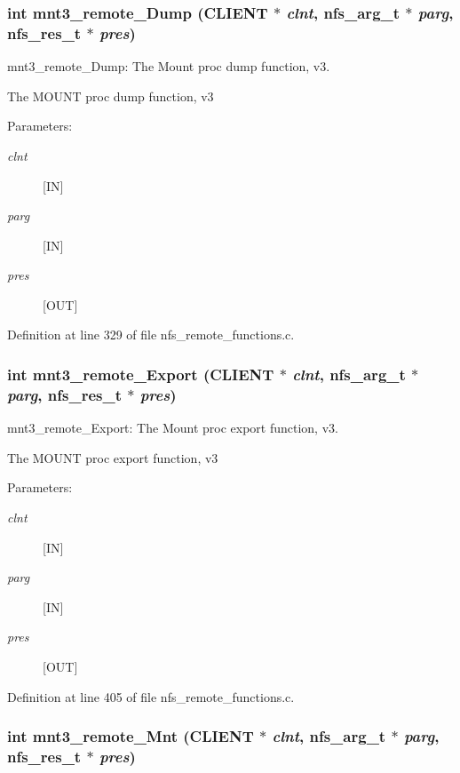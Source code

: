 \subsubsection{\setlength{\rightskip}{0pt plus 5cm}int mnt3\_\-remote\_\-Dump (CLIENT $\ast$ {\em clnt}, nfs\_\-arg\_\-t $\ast$ {\em parg}, nfs\_\-res\_\-t $\ast$ {\em pres})}\label{group__MNTprocs_ga8}


mnt3\_\-remote\_\-Dump: The Mount proc dump function, v3.

The MOUNT proc dump function, v3

\begin{Desc}
\item[Parameters:]
\begin{description}
\item[{\em clnt}][IN] \item[{\em parg}][IN] \item[{\em pres}][OUT] \end{description}
\end{Desc}


Definition at line 329 of file nfs\_\-remote\_\-functions.c.
\subsubsection{\setlength{\rightskip}{0pt plus 5cm}int mnt3\_\-remote\_\-Export (CLIENT $\ast$ {\em clnt}, nfs\_\-arg\_\-t $\ast$ {\em parg}, nfs\_\-res\_\-t $\ast$ {\em pres})}\label{group__MNTprocs_ga11}


mnt3\_\-remote\_\-Export: The Mount proc export function, v3.

The MOUNT proc export function, v3

\begin{Desc}
\item[Parameters:]
\begin{description}
\item[{\em clnt}][IN] \item[{\em parg}][IN] \item[{\em pres}][OUT] \end{description}
\end{Desc}


Definition at line 405 of file nfs\_\-remote\_\-functions.c.
\subsubsection{\setlength{\rightskip}{0pt plus 5cm}int mnt3\_\-remote\_\-Mnt (CLIENT $\ast$ {\em clnt}, nfs\_\-arg\_\-t $\ast$ {\em parg}, nfs\_\-res\_\-t $\ast$ {\em pres})}\label{group__MNTprocs_ga7}


